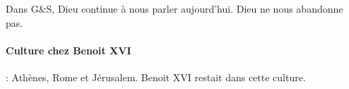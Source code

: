 \begin{Def}
  Dans G\&S, Dieu continue à nous parler  aujourd'hui. Dieu ne nous abandonne pas. 
\end{Def}


 
\paragraph{Culture chez Benoit XVI}
 : Athènes, Rome et Jérusalem. Benoit XVI restait dans cette culture. 